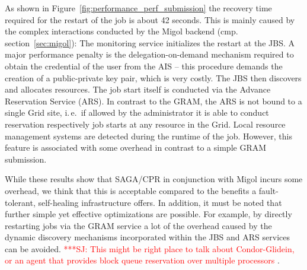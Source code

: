 \documentclass[times, 10pt, twocolumn]{article}
\newcommand{\jhanote}[1]{ {\textcolor{red} { ***SJ: #1 }}}
\newcommand{\jhanote}[1]{}
\begin{document}
As shown in Figure~\ref{fig:performance_perf_submission} the recovery
time required for the restart of the job is about 42 seconds. This is
mainly caused by the complex interactions conducted by the Migol
backend (cmp. section~\ref{sec:migol}): The monitoring service
initializes the restart at the JBS.  A major performance penalty is
the delegation-on-demand mechanism required to obtain the credential
of the user from the AIS -- this procedure demands the creation of a
public-private key pair, which is very costly. The JBS then discovers
and allocates resources.  The job start itself is conducted via the
Advance Reservation Service (ARS). In contrast to the GRAM, the ARS is
not bound to a single Grid site, i.\,e.\ if allowed by the
administrator it is able to conduct reservation respectively job
starts at any resource in the Grid. Local resource management systems
are detected during the runtime of the job. However, this feature is
associated with some overhead in contrast to a simple GRAM submission.



While these results show that SAGA/CPR in conjunction with Migol
incurs some overhead, we think that this is acceptable compared to the
benefits a fault-tolerant, self-healing infrastructure offers. In
addition, it must be noted that further simple yet effective
optimizations are possible. For example, by directly restarting jobs
via the GRAM service a lot of the overhead caused by the dynamic
discovery mechanisms incorporated within the JBS and ARS services can
be avoided. \jhanote{This might be right place to talk about
  Condor-Glidein, or an agent that provides block queue reservation
  over multiple processors}.
\end{document}
